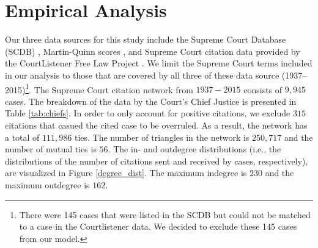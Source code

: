 \documentclass[headsepline=true, abstracton]{scrartcl}
\begin{document}
 \section{Empirical Analysis}
Our three data sources for this study include the Supreme Court Database (SCDB) \citep{spaeth2014supreme}, Martin-Quinn scores \citep{martin2002dynamic}, and Supreme Court citation data provided by the CourtListener Free Law Project \citep{CourtListener}. We limit the Supreme Court terms included in our analysis to those that are covered by all three of these data source (1937--2015)\footnote{There were 145 cases that were listed in the SCDB but could not be matched to a case in the Courtlistener data. We decided to exclude these 145 cases from our model.}. The Supreme Court citation network from $1937 - 2015$ consists of $9,945$ cases. The breakdown of the data by the Court's Chief Justice is presented in Table \ref{tab:chiefs}. In order to only account for positive citations, we exclude $315$ citations that casued the cited case to be overruled. As a result, the network has a total of $111,986$ ties. The number of triangles in the network is $250,717$ and the number of mutual ties is $56$. The in- and outdegree distributions (i.e., the distributions of the number of citations sent and received by cases, respectively), are visualized in Figure \ref{degree_dist}. The maximum indegree is $230$ and the maximum outdegree is $162$.
\end{document}
